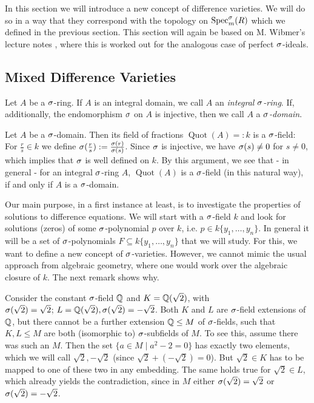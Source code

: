 In this section we will introduce a new concept of difference varieties. We will do so in a way that they correspond with the topology on $\operatorname{Spec}^\sigma_m(R)$ which we defined in the previous section. This section will again be based on M. Wibmer's lecture notes \cite{wibmer}, 
where this is worked out for the analogous case of perfect $\sigma$-ideals.

\subsection{Mixed Difference Varieties}


\begin{defn}
Let $A$ be a $\sigma$-ring. If $A$ is an integral domain, we call $A$ an \emph{integral $\sigma$-ring}. If, additionally, the endomorphism $\sigma$ on $A$ is injective, then we call $A$ a \emph{$\sigma$-domain}.  
\end{defn}

\begin{rem}\label{sdomain=field}
Let $A$ be a $\sigma$-domain. Then its field of fractions $\operatorname{Quot}(A) =: k$ is a $\sigma$-field: For $\frac{r}{s} \in k$ we define $\sigma(\frac{r}{s}):= \frac{\sigma(r)}{\sigma(s)}$. Since $\sigma$ is injective, we have $\sigma(s) \neq 0$ for $s \neq 0$, which implies that $\sigma$ is well defined on $k$.
By this argument, we see that - in general - for an integral $\sigma$-ring $A$, $\operatorname{Quot}(A)$ is a $\sigma$-field (in this natural way), if and only if $A$ is a $\sigma$-domain.
\end{rem}

Our main purpose, in a first instance at least, is to investigate the properties of solutions to difference equations. 
We will start with a $\sigma$-field $k$ and look for solutions (zeros) of some $\sigma$-polynomial $p$ over $k$, i.e. $p \in k\{y_1, \ldots, y_n \}$. In general it will be a set of $\sigma$-polynomials $F \subseteq k\{y_1, \ldots, y_n \}$ that we will study. 
For this, we want to define a new concept of $\sigma$-varieties. However, we cannot mimic the usual approach from algebraic geometry, where one would work over the algebraic closure of $k$. The next remark shows why.

\begin{rem}\label{incompatibleextensions}
 Consider the constant $\sigma$-field $\mathbb{Q}$ and $K = \mathbb{Q}(\sqrt{2})$, with \\ $\sigma (\sqrt{2}) = \sqrt{2}$; $L = \mathbb{Q}(\sqrt{2}), \sigma(\sqrt{2}) = - \sqrt{2}$. 
Both $K$ and $L$ are $\sigma$-field extensions of $\mathbb{Q}$, but there cannot be a further extension $\mathbb{Q} \leq M$ of $\sigma$-fields, such that $K,L \leq M$ are both (isomorphic to) $\sigma$-subfields of $M$. 
To see this, assume there was such an $M$. Then the set $\{ a \in M \mid a^2 - 2 = 0 \}$ has exactly two elements, which we will call $\sqrt{2}, -\sqrt{2}$ (since $\sqrt{2} + (- \sqrt{2}) = 0$).
But $\sqrt{2} \in K$ has to be mapped to one of these two in any embedding. The same holds true for $\sqrt{2} \in L$, which already yields the contradiction,
 since in $M$ either $\sigma(\sqrt{2}) = \sqrt{2}$ or $\sigma(\sqrt{2}) = -\sqrt{2}$.
\end{rem}

